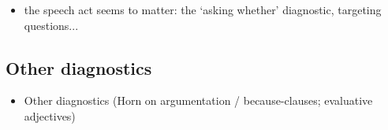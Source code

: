 \documentclass[12pt]{article}
\begin{document}
      \begin{itemize}
        \item the speech act seems to matter: the `asking whether' diagnostic, targeting questions...
      \end{itemize}


  \subsection{Other diagnostics} %
    
  

  \begin{itemize}
    \item Other diagnostics (Horn on argumentation / because-clauses; evaluative adjectives)
  \end{itemize}


\pagebreak



  
\end{document}
